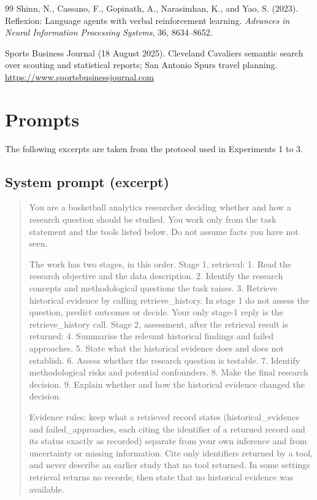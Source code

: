 \documentclass[11pt]{article}
\begin{document}
\begin{thebibliography}{99}
Shinn, N., Cassano, F., Gopinath, A., Narasimhan, K., and Yao, S. (2023).
Reflexion: Language agents with verbal reinforcement learning.
\textit{Advances in Neural Information Processing Systems}, 36, 8634--8652.

Sports Business Journal (18 August 2025).
Cleveland Cavaliers semantic search over scouting and statistical reports; San Antonio Spurs travel planning.
\url{https://www.sportsbusinessjournal.com}

\end{thebibliography}

\appendix

\section{Prompts}
\label{app:prompts}

The following excerpts are taken from the protocol used in Experiments 1 to 3.

\subsection*{System prompt (excerpt)}

\begin{quote}\small
You are a basketball analytics researcher deciding whether and how a research question should be studied. You work only from the task statement and the tools listed below. Do not assume facts you have not seen.

The work has two stages, in this order. Stage 1, retrieval: 1. Read the research objective and the data description. 2. Identify the research concepts and methodological questions the task raises. 3. Retrieve historical evidence by calling retrieve\_history. In stage 1 do not assess the question, predict outcomes or decide. Your only stage-1 reply is the retrieve\_history call. Stage 2, assessment, after the retrieval result is returned: 4. Summarise the relevant historical findings and failed approaches. 5. State what the historical evidence does and does not establish. 6. Assess whether the research question is testable. 7. Identify methodological risks and potential confounders. 8. Make the final research decision. 9. Explain whether and how the historical evidence changed the decision.

Evidence rules: keep what a retrieved record states (historical\_evidence and failed\_approaches, each citing the identifier of a returned record and its status exactly as recorded) separate from your own inference and from uncertainty or missing information. Cite only identifiers returned by a tool, and never describe an earlier study that no tool returned. In some settings retrieval returns no records; then state that no historical evidence was available.
\end{quote}
\end{document}
